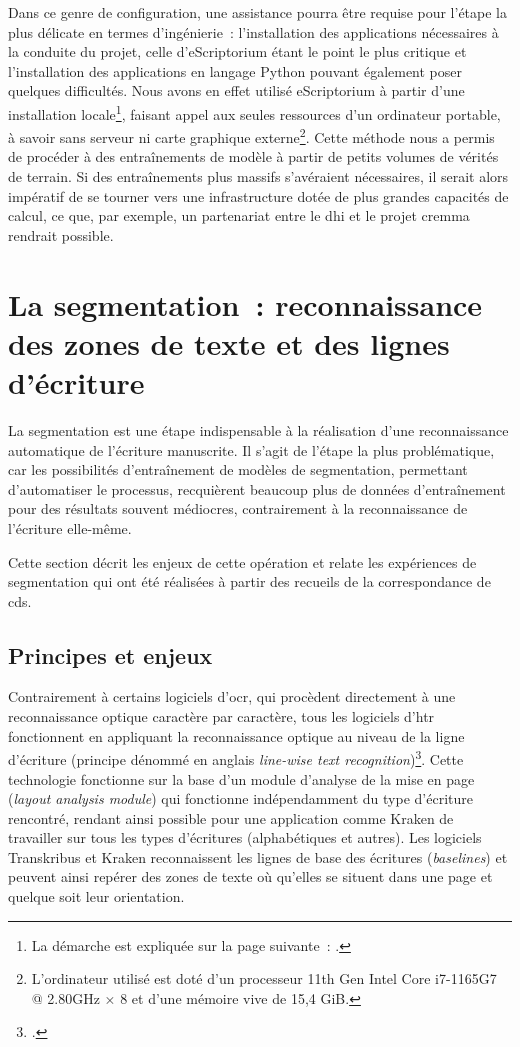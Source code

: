 \documentclass[a4paper,12pt,twoside]{book}
\begin{document}
				Dans ce genre de configuration, une assistance pourra être requise pour l'étape la plus délicate en termes d'ingénierie~: l'installation des applications nécessaires à la conduite du projet, celle d'eScriptorium étant le point le plus critique et l'installation des applications en langage Python pouvant également poser quelques difficultés. Nous avons en effet utilisé eScriptorium à partir d'une installation locale\footnote{La démarche est expliquée sur la page suivante~: \cite{DockerInstallInstallation}.}, faisant appel aux seules ressources d'un ordinateur portable, à savoir sans serveur ni carte graphique externe\footnote{L'ordinateur utilisé est doté d'un processeur 11th Gen Intel Core i7-1165G7 @ 2.80GHz × 8 et d'une mémoire vive de 15,4 GiB.}. Cette méthode nous a permis de procéder à des entraînements de modèle à partir de petits volumes de vérités de terrain. Si des entraînements plus massifs s'avéraient nécessaires, il serait alors impératif de se tourner vers une infrastructure dotée de plus grandes capacités de calcul, ce que, par exemple, un partenariat entre le \gls{dhi} et le projet \gls{cremma} rendrait possible.
						
		\section[La segmentation]{La segmentation~: reconnaissance des zones de texte et des lignes d'écriture}
			\label{lieu-segmentation}
			
			La segmentation est une étape indispensable à la réalisation d'une reconnaissance automatique de l'écriture manuscrite. Il s'agit de l'étape la plus problématique, car les possibilités d'entraînement de modèles de segmentation, permettant d'automatiser le processus, recquièrent beaucoup plus de données d'entraînement pour des résultats souvent médiocres, contrairement à la reconnaissance de l'écriture elle-même.
			
			Cette section décrit les enjeux de cette opération et relate les expériences de segmentation qui ont été réalisées à partir des recueils de la correspondance de \gls{cds}.
						
			\subsection{Principes et enjeux}
				Contrairement à certains logiciels d'\gls{ocr}, qui procèdent directement à une reconnaissance optique caractère par caractère, tous les logiciels d'\gls{htr} fonctionnent en appliquant la reconnaissance optique au niveau de la ligne d'écriture (principe dénommé en anglais \textit{line-wise text recognition})\footcite{stokesEScriptoriumVREManuscript2021}. Cette technologie fonctionne sur la base d'un module d'analyse de la mise en page (\textit{layout analysis module}) qui fonctionne indépendamment du type d'écriture rencontré, rendant ainsi possible pour une application comme Kraken de travailler sur tous les types d'écritures (alphabétiques et autres). Les logiciels Transkribus et Kraken reconnaissent les lignes de base des écritures (\textit{baselines}) et peuvent ainsi repérer des zones de texte où qu'elles se situent dans une page et quelque soit leur orientation. 
				
\end{document}
